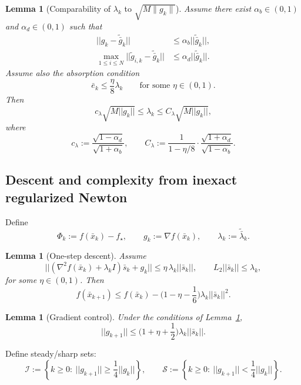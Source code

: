 \documentclass[11pt,a4paper]{article}
\def\norm#1{||#1||}%
\newtheorem{lemma}[theorem]{Lemma}
\newcommand{\norm}[1]{\left\|#1\right\|}
\begin{document}
	\begin{lemma}[Comparability of $\lambda_k$ to $\sqrt{M\|g_k\|}$]\label{lem:lambda-comparable}
		Assume there exist $\alpha_b\in(0,1)$ and $\alpha_d\in(0,1)$ such that
		\begin{align}
			\label{eq:rel-bridge}
			\norm{g_k-\tilde{\bar g}_k} &\le \alpha_b \norm{\tilde{\bar g}_k},\\
			\label{eq:rel-disp}
			\max_{1\le i\le N}\norm{\tilde g_{i,k}-\tilde{\bar g}_k} &\le \alpha_d \norm{\tilde{\bar g}_k}.
		\end{align}
		Assume also the absorption condition
		\begin{equation}\label{eq:e-absorb}
			\bar e_k\le \frac{\eta}{8}\lambda_k \qquad\text{for some }\eta\in(0,1).
		\end{equation}
		Then
		\begin{equation}\label{eq:lambda-comp}
			c_\lambda\sqrt{M\norm{g_k}}\le \lambda_k \le C_\lambda\sqrt{M\norm{g_k}},
		\end{equation}
		where
		\[
		c_\lambda:=\frac{\sqrt{1-\alpha_d}}{\sqrt{1+\alpha_b}},
		\qquad
		C_\lambda:=\frac{1}{1-\eta/8}\cdot \frac{\sqrt{1+\alpha_d}}{\sqrt{1-\alpha_b}}.
		\]
	\end{lemma}
	
	\subsection{Descent and complexity from inexact regularized Newton}
	Define
	\[
	\Phi_k:=f(\bar x_k)-f_\star,\qquad g_k:=\nabla f(\bar x_k),\qquad \lambda_k:=\tilde{\bar\lambda}_k.
	\]
	
	\begin{lemma}[One-step descent]\label{lem:descent-inexact}
		Assume
		\[
		\norm{(\nabla^2 f(\bar x_k)+\lambda_k I)\bar s_k+g_k}\le \eta\,\lambda_k\norm{\bar s_k},
		\qquad
		L_2\norm{\bar s_k}\le \lambda_k,
		\]
		for some $\eta\in(0,1)$.
		Then
		\[
		f(\bar x_{k+1})\le f(\bar x_k) - \Big(1-\eta-\frac16\Big)\lambda_k\norm{\bar s_k}^2.
		\]
	\end{lemma}
	
	\begin{lemma}[Gradient control]\label{lem:grad-inexact}
		Under the conditions of Lemma~\ref{lem:descent-inexact},
		\[
		\norm{g_{k+1}}\le \Big(1+\eta+\frac12\Big)\lambda_k\norm{\bar s_k}.
		\]
	\end{lemma}
	
	Define steady/sharp sets:
	\[
	\mathcal I:=\left\{k\ge 0:\ \norm{g_{k+1}}\ge \frac14\norm{g_k}\right\},
	\qquad
	\mathcal S:=\left\{k\ge 0:\ \norm{g_{k+1}}< \frac14\norm{g_k}\right\}.
	\]
	
\end{document}
